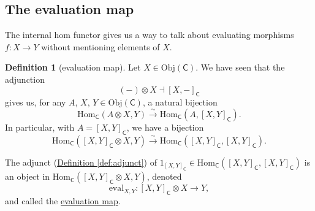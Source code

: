 \documentclass[a4paper]{report}
\newcommand{\defn}[1]{\ul{#1}}
\newcommand{\Obj}{\mathrm{Obj}}
\newcommand{\Hom}{\mathrm{Hom}}
\newcommand{\ev}{\mathrm{eval}}
\theoremstyle{definition}
\newtheorem{definition}{Definition}[section]
\theoremstyle{plain}
\theoremstyle{remark}
\begin{document}
\subsection{The evaluation map}
The internal hom functor gives us a way to talk about evaluating morphisms $f\colon X \to Y$ without mentioning elements of $X$.
\begin{definition}[evaluation map]
  \label{def:evaluationmap}
  Let $X \in \Obj(\mathsf{C})$. We have seen that the adjunction
  \begin{equation*}
    (-) \otimes X \dashv [X, -]_{\mathsf{C}}
  \end{equation*}
  gives us, for any $A$, $X$, $Y \in \Obj(\mathsf{C})$, a natural bijection
  \begin{equation*}
    \Hom_{\mathsf{C}}(A \otimes X, Y) \overset{\sim}{\to} \Hom_{\mathsf{C}}(A, [X, Y]_{\mathsf{C}}).
  \end{equation*}
  In particular, with $A = [X, Y]_{\mathsf{C}}$, we have a bijection
  \begin{equation*}
    \Hom_{\mathsf{C}}([X, Y]_{\mathsf{C}} \otimes X, Y) \overset{\sim}{\to} \Hom_{\mathsf{C}}([X, Y]_{\mathsf{C}}, [X, Y]_{\mathsf{C}}).
  \end{equation*}

  The adjunct (\hyperref[def:adjunct]{Definition \ref*{def:adjunct}}) of $1_{[X, Y]_{\mathsf{C}}} \in \Hom_{\mathsf{C}}([X, Y]_{\mathsf{C}}, [X, Y]_{\mathsf{C}})$ is an object in $\Hom_{\mathsf{C}}\left( [X, Y]_{\mathsf{C}} \otimes X, Y \right)$, denoted 
  \begin{equation*}
    \ev_{X, Y}\colon [X, Y]_{\mathsf{C}} \otimes X \to Y,
  \end{equation*}
  and called the \defn{evaluation map}.
\end{definition}
\end{document}
